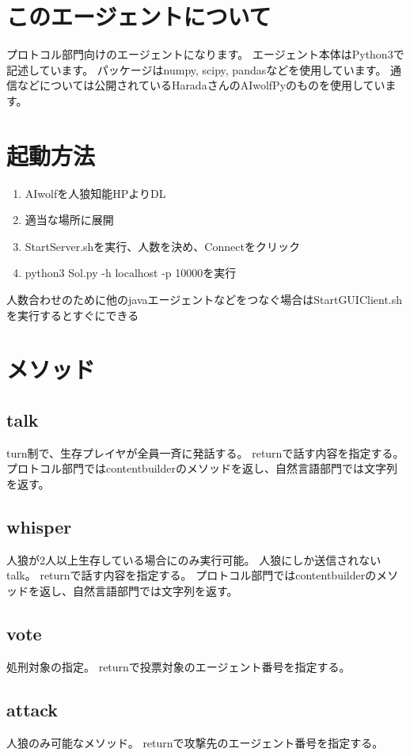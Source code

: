 \documentclass[a4j,twocolumn]{jarticle}
\begin{document}
  \pagestyle{fancy}
  \rhead{\thepage}
  \cfoot{}
\section{このエージェントについて}
  プロトコル部門向けのエージェントになります。
  エージェント本体はPython3で記述しています。
  パッケージはnumpy, scipy, pandasなどを使用しています。
  通信などについては公開されているHaradaさんのAIwolfPyのものを使用しています。
\section{起動方法}
  \begin{enumerate}
    \item AIwolfを人狼知能HPよりDL
    \item 適当な場所に展開
    \item StartServer.shを実行、人数を決め、Connectをクリック
    \item python3 Sol.py -h localhost -p 10000を実行
  \end{enumerate}
  人数合わせのために他のjavaエージェントなどをつなぐ場合はStartGUIClient.shを実行するとすぐにできる
\section{メソッド}
  \subsection{talk}
    turn制で、生存プレイヤが全員一斉に発話する。
    returnで話す内容を指定する。
    プロトコル部門ではcontentbuilderのメソッドを返し、自然言語部門では文字列を返す。
  \subsection{whisper}
    人狼が2人以上生存している場合にのみ実行可能。
    人狼にしか送信されないtalk。
    returnで話す内容を指定する。
    プロトコル部門ではcontentbuilderのメソッドを返し、自然言語部門では文字列を返す。
  \subsection{vote}
    処刑対象の指定。
    returnで投票対象のエージェント番号を指定する。
  \subsection{attack}
    人狼のみ可能なメソッド。
    returnで攻撃先のエージェント番号を指定する。
\end{document}
